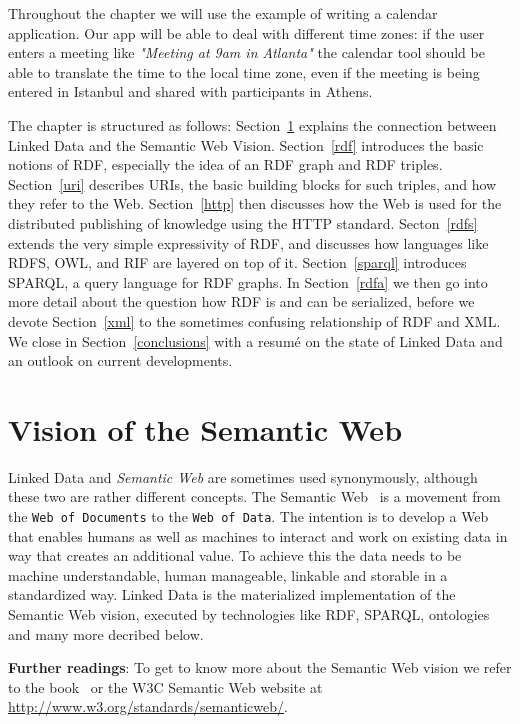 Throughout the chapter we will use the example of writing a calendar application.
Our app will be able to deal with different time zones:
if the user enters a meeting like \textit{"Meeting at 9am in Atlanta"} the calendar tool should be able to translate the time to the local time zone, even if the meeting is being entered in Istanbul and shared with participants in Athens.

The chapter is structured as follows:
Section~\ref{semanticweb} explains the connection between Linked Data and the Semantic Web Vision.
Section~\ref{rdf} introduces the basic notions of RDF, especially the idea of an RDF graph and RDF triples.
Section~\ref{uri} describes URIs, the basic building blocks for such triples, and how they refer to the Web.
Section~\ref{http} then discusses how the Web is used for the distributed publishing of knowledge using the HTTP standard.
Secton~\ref{rdfs} extends the very simple expressivity of RDF, and discusses how languages like RDFS, OWL, and RIF are layered on top of it.
Section~\ref{sparql} introduces SPARQL, a query language for RDF graphs.
In Section~\ref{rdfa} we then go into more detail about the question how RDF is and can be serialized,
before we devote Section~\ref{xml} to the sometimes confusing relationship of RDF and XML.
We close in Section~\ref{conclusions} with a resum\'{e} on the state of Linked Data and an outlook on current developments.

\section{Vision of the Semantic Web}
\label{semanticweb}

Linked Data and \emph{Semantic Web} are sometimes used synonymously, although these two are rather different concepts.
The Semantic Web~\cite{semanticWeb} is a movement from the \texttt{Web of Documents} to the \texttt{Web of Data}.
The intention is to develop a Web that enables humans as well as machines to interact and work on existing data in way that creates an additional value.
To achieve this the data needs to be machine understandable, human manageable, linkable and storable in a standardized way.
Linked Data is the materialized implementation of the Semantic Web vision, executed by technologies like RDF, SPARQL, ontologies and many more decribed below.

\medskip

\textbf{Further readings}:
To get to know more about the Semantic Web vision we refer to the book~\cite{swbook} or the W3C Semantic Web website at \url{http://www.w3.org/standards/semanticweb/}.

